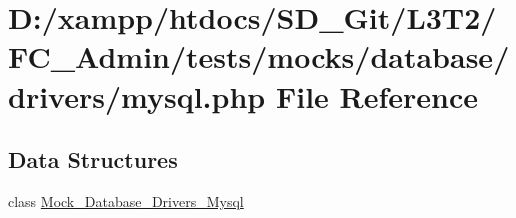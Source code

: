 \hypertarget{drivers_2mysql_8php}{}\section{D\+:/xampp/htdocs/\+S\+D\+\_\+\+Git/\+L3\+T2/\+F\+C\+\_\+\+Admin/tests/mocks/database/drivers/mysql.php File Reference}
\label{drivers_2mysql_8php}
\subsection*{Data Structures}
\begin{DoxyCompactItemize}
\item 
class \hyperlink{class_mock___database___drivers___mysql}{Mock\+\_\+\+Database\+\_\+\+Drivers\+\_\+\+Mysql}
\end{DoxyCompactItemize}
